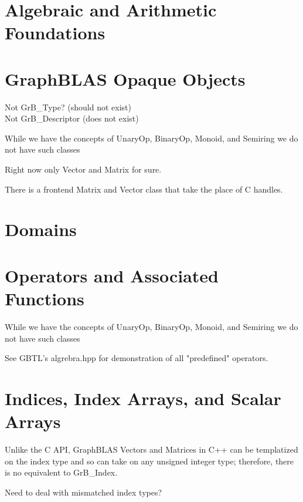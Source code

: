 \section{Algebraic and Arithmetic Foundations}


\section{GraphBLAS Opaque Objects}

Not GrB\_Type? (should not exist)\\
Not GrB\_Descriptor (does not exist)

While we have the concepts of UnaryOp, BinaryOp, Monoid, and Semiring we do not have such classes

Right now only Vector and Matrix for sure.

There is a frontend Matrix and Vector class that take the place of C handles.

\section{Domains}


\section{Operators and Associated Functions}

While we have the concepts of UnaryOp, BinaryOp, Monoid, and Semiring we do not have such classes

See GBTL's {\sf algrebra.hpp} for demonstration of all "predefined" operators.


\section{Indices, Index Arrays, and Scalar Arrays}

Unlike the C API, GraphBLAS Vectors and Matrices in C++ can be templatized on
the index type and so can take on any unsigned integer type; therefore, there is
no equivalent to GrB\_Index.

Need to deal with mismatched index types?

